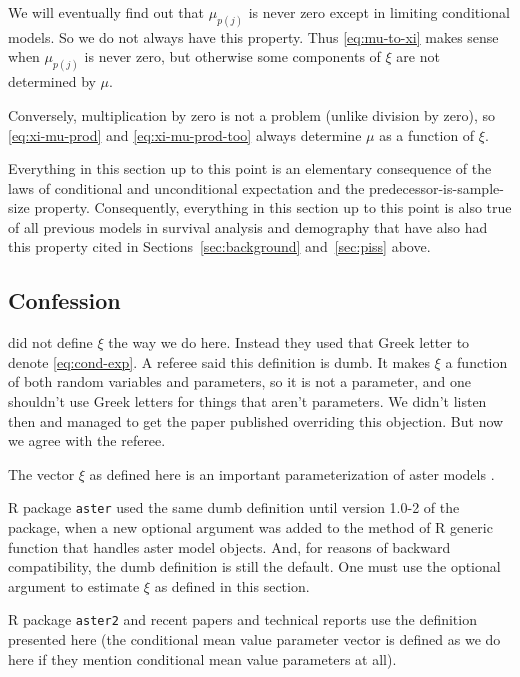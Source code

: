 We will eventually find out that $\mu_{p(j)}$ is never zero except in
limiting conditional models.  So we do not always have this property.
Thus \eqref{eq:mu-to-xi} makes sense when $\mu_{p(j)}$ is never zero,
but otherwise some components of $\xi$ are not determined by $\mu$.

Conversely, multiplication by zero is not a problem (unlike division by zero),
so \eqref{eq:xi-mu-prod} and \eqref{eq:xi-mu-prod-too} always determine
$\mu$ as a function of $\xi$.

Everything in this section up to this point is an elementary consequence
of the laws of conditional and unconditional expectation and the
predecessor-is-sample-size property.  Consequently,
everything in this section up to this point is also true of all previous
models in survival analysis and demography that have also had this property
cited in Sections~\ref{sec:background} and~\ref{sec:piss} above.

\subsection{Confession}

 did not define $\xi$
the way we do here.  Instead they used that Greek letter to denote
\eqref{eq:cond-exp}.
A referee said this definition is dumb.  It makes $\xi$ a function
of both random variables and parameters, so it is not a parameter,
and one shouldn't use Greek letters for things that aren't parameters.
We didn't listen then and managed to get the
paper published overriding this objection.  But now we agree with the referee.

The vector $\xi$ as defined here is an important parameterization of
aster models \citep[this has been realized since][]{aster-philosophical}.

R package \texttt{aster} used the same dumb definition until version
1.0-2 of the package, when a new optional argument 
was added to the method of R generic function  that handles
aster model objects.  And, for reasons of backward compatibility,
the dumb definition is still the default.
One must use the optional argument 
to estimate $\xi$ as defined in this section.

R package \texttt{aster2} and recent papers and technical reports use
the definition presented here (the conditional mean value parameter vector
is defined as we do here if they mention conditional mean value parameters
at all).

